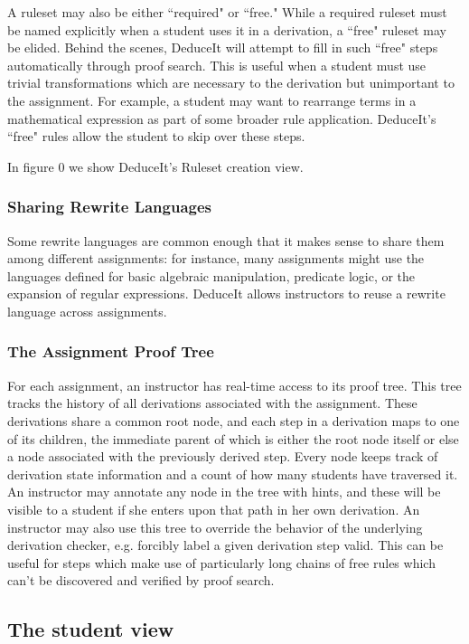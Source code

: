 \documentclass{sigchi}
\begin{document}
A ruleset may also be either ``required" or ``free." While a required ruleset must be named explicitly when a student uses it in a derivation, a ``free" ruleset may be elided. Behind the scenes, DeduceIt will attempt to fill in such ``free" steps automatically through proof search. This is useful when a student must use trivial transformations which are necessary to the derivation but unimportant to the assignment. For example, a student may want to rearrange terms in a mathematical expression as part of some broader rule application. DeduceIt's ``free" rules allow the student to skip over these steps.  

In figure 0 we show DeduceIt's Ruleset creation view.

\subsubsection{Sharing Rewrite Languages}

Some rewrite languages are common enough that it makes sense to share them among different assignments: for instance, many assignments might use the languages defined for basic algebraic manipulation, predicate logic, or the expansion of regular expressions. DeduceIt allows instructors to reuse a rewrite language across assignments.

\subsubsection{The Assignment Proof Tree}

For each assignment, an instructor has real-time access to its proof tree. This tree tracks the history of all derivations associated with the assignment. These derivations share a common root node, and each step in a derivation maps to one of its children, the immediate parent of which is either the root node itself or else a node associated with the previously derived step. Every node keeps track of derivation state information and a count of how many students have traversed it. An instructor may annotate any node in the tree with hints, and these will be visible to a student if she enters upon that path in her own derivation. An instructor may also use this tree to override the behavior of the underlying derivation checker, e.g. forcibly label a given derivation step valid. This can be useful for steps which make use of particularly long chains of free rules which can't be discovered and verified by proof search.


\subsection{The student view}
\end{document}
